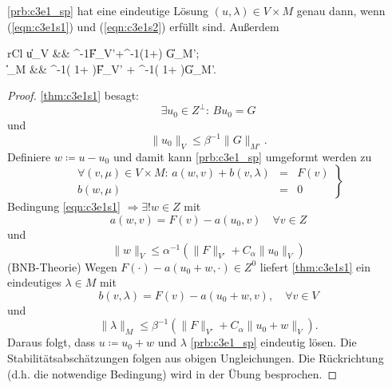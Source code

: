 \documentclass[../skript.tex]{subfiles}
\begin{document}
\begin{theorem}\label{thm:c3e1s2}
	\cref{prb:c3e1_sp} hat eine eindeutige Lösung $(u,\lambda)\in V\times M$ genau dann, wenn
	(\ref{eqn:c3e1s1}) und (\ref{eqn:c3e1s2}) erfüllt sind. Außerdem
	\begin{IEEEeqnarray*}{rCl}
		\|u\|_V &\leq& \alpha^{-1}\|F\|_{V'}+\beta^{-1}\left(1+\right) \|G\|_{M'};\\
		\|\lambda\|_M &\leq& \beta^{-1}\left( 1+ \right)\|F\|_{V'} + \beta^{-1}\left( 1+  \right)\|G\|_{M'}.
	\end{IEEEeqnarray*}
\end{theorem}
\begin{proof}
	\cref{thm:c3e1s1}  besagt:
	\[
		\exists u_0\in Z^\perp:\,Bu_0=G
	\]
	und
	\[
		\|u_0\|_V \leq \beta^{-1}\|G\|_{M'}.
	\]
	Definiere $w\coloneqq u-u_0$ und damit kann \cref{prb:c3e1_sp} umgeformt werden zu
	\begin{equation}\label{prb:c2e1sp'}
		\left.
			\begin{aligned}
				\forall (v,\mu)\in V\times M:\,a(w,v)+ b(v,\lambda) &=& F(v)\\
				b(w,\mu) &=& 0
			\end{aligned}
		\right\}
	\end{equation}
	Bedingung \ref{eqn:c3e1s1} $\Rightarrow \exists!w\in Z$ mit
	\[
		a(w,v) = F(v) - a(u_0,v)\quad\forall v\in Z
	\]
	und 
	\[
		\|w\|_V \leq \alpha^{-1}\left( \|F\|_{V'} + C_\alpha\|u_0\|_V \right) 
	\]
	(BNB-Theorie)\newline\noindent
	Wegen $F(\cdot) - a(u_0+w,\cdot)\in Z^0$ liefert \cref{thm:c3e1s1} ein eindeutiges $\lambda\in M$ mit
	\[
		b(v,\lambda) = F(v)-a(u_0+w,v),\quad\forall v\in V
	\]
	und 
	\[
		\|\lambda\|_M\leq\beta^{-1}\left( \|F\|_{V'} + C_\alpha\|u_0+w\|_V \right).
	\]
	Daraus folgt, dass $u\coloneqq u_0+w$ und $\lambda$ \cref{prb:c3e1_sp} eindeutig lösen. Die Stabilitätsabschätzungen folgen aus obigen Ungleichungen.\newline\newline\noindent
	Die Rückrichtung (d.h. die notwendige Bedingung) wird in der Übung besprochen. 
\end{proof}
\end{document}
